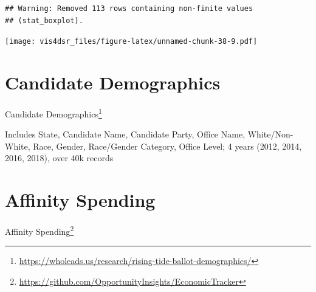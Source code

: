 \documentclass[
]{krantz}
\renewcommand{\href}[2]{#2\footnote{\url{#1}}}
\begin{document}
\begin{verbatim}
## Warning: Removed 113 rows containing non-finite values
## (stat_boxplot).
\end{verbatim}

\texttt{[image: vis4dsr\_files/figure-latex/unnamed-chunk-38-9.pdf]}

\hypertarget{candidate-demographics}{%
\section*{Candidate Demographics}\label{candidate-demographics}}


\href{https://wholeads.us/research/rising-tide-ballot-demographics/}{Candidate Demographics}

Includes State, Candidate Name, Candidate Party, Office Name, White/Non-White, Race, Gender, Race/Gender Category, Office Level; 4 years (2012, 2014, 2016, 2018), over 40k records

\hypertarget{affinity-spending}{%
\section*{Affinity Spending}\label{affinity-spending}}


\href{https://github.com/OpportunityInsights/EconomicTracker}{Affinity Spending}

  

\backmatter
\printindex
\end{document}
